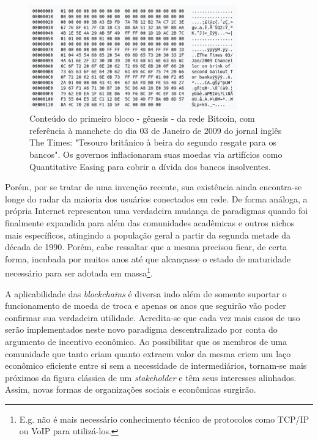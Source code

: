 \documentclass[a4paper,12pt]{monografia}
\theoremstyle{plain}
\theoremstyle{definition}
\theoremstyle{remark}
\begin{document}
\begin{figure}[ht]
 \begin{center}
   \includegraphics[width=90mm,scale=1.0]{./figs/genesis.png}
   \caption[Bloco g\^enesis da rede Bitcoin]{Conte\'udo do primeiro bloco - g\^enesis - da rede Bitcoin, com refer\^encia \`a manchete do dia 03 de Janeiro de 2009 do jornal ingl\^es The Times: "Tesouro brit\^anico \`a beira do segundo resgate para os bancos". Os governos inflacionaram suas moedas via artif\'icios como Quantitative Easing para cobrir a d\'ivida dos bancos insolventes.}
   \label{fig:genesis}
 \end{center}
\end{figure}

Por\'{e}m, por se tratar de uma inven\c{c}\~{a}o recente, sua exist\^{e}ncia ainda encontra-se longe do radar da maioria dos usu\'{a}rios conectados em rede.
De forma an\'{a}loga, a pr\'{o}pria Internet representou uma verdadeira mudan\c{c}a de paradigmas quando foi finalmente expandida para al\'{e}m das comunidades acad\^{e}micas e outros nichos mais espec\'{i}ficos, atingindo a popula\c{c}\~{a}o geral a partir da segunda metade da d\'{e}cada de 1990.
Por\'{e}m, cabe ressaltar que a mesma precisou ficar, de certa forma, incubada por muitos anos at\'{e} que alcan\c{c}asse o estado de maturidade necess\'{a}rio para ser adotada em massa\footnote{E.g. n\~ao \'e mais necess\'ario conhecimento t\'ecnico de protocolos como TCP/IP ou VoIP para utiliz\'a-los.}.

A aplicabilidade das \textit{blockchains} \'{e} diversa indo al\'{e}m de somente suportar o funcionamento de moeda de troca e apenas os anos que seguir\~{a}o v\~{a}o poder confirmar sua verdadeira utilidade.
Acredita-se que cada vez mais casos de uso ser\~{a}o implementados neste novo paradigma descentralizado por conta do argumento de incentivo econ\^{o}mico.
Ao possibilitar que os membros de uma comunidade que tanto criam quanto extraem valor da mesma criem um la\c{c}o econ\^{o}mico eficiente entre si sem a necessidade de intermedi\'{a}rios, tornam-se mais pr\'{o}ximos da figura cl\'{a}ssica de um \textit{stakeholder} e t\^{e}m seus interesses alinhados.
Assim, novas formas de organiza\c{c}\~{o}es sociais e econ\^{o}micas surgir\~{a}o.
\end{document}
